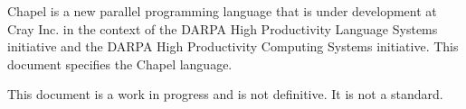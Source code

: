 \label{Scope}

Chapel is a new parallel programming language that is under
development at Cray Inc. in the context of the DARPA High Productivity
Language Systems initiative and the DARPA High Productivity Computing
Systems initiative.  This document specifies the Chapel language.

This document is a work in progress and is not definitive.  It is not
a standard.
